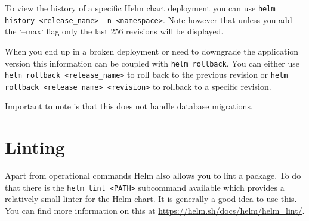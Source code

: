 \documentclass[english,10pt,a4paper]{scrreprt}
\begin{document}
To view the history of a specific Helm chart deployment you can use \texttt{helm history <release_name> -n <namespace>}.
Note however that unless you add the `--max` flag only the last 256 revisions will be displayed.

When you end up in a broken deployment or need to downgrade the application version this information can be coupled with \texttt{helm rollback}.
You can either use \texttt{helm rollback <release_name>} to roll back to the previous revision or \texttt{helm rollback <release_name> <revision>} to rollback to a specific revision.

Important to note is that this does not handle database migrations.

\section{Linting}
Apart from operational commands Helm also allows you to lint a package.
To do that there is the \texttt{helm lint <PATH>} subcommand available which provides a relatively small linter for the Helm chart.
It is generally a good idea to use this.
You can find more information on this at \url{https://helm.sh/docs/helm/helm_lint/}.

\cleardoublepage
\appendix
\printglossaries

\nocite{*}
\printbibliography[heading=bibintoc,title={Sources}]

\listoffigures
\end{document}
